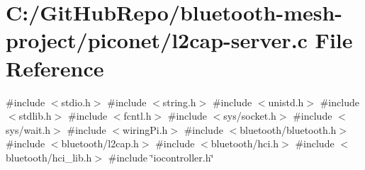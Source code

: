 \hypertarget{piconet_2l2cap-server_8c}{}\section{C\+:/\+Git\+Hub\+Repo/bluetooth-\/mesh-\/project/piconet/l2cap-\/server.c File Reference}
\label{piconet_2l2cap-server_8c}
{\ttfamily \#include $<$stdio.\+h$>$}\newline
{\ttfamily \#include $<$string.\+h$>$}\newline
{\ttfamily \#include $<$unistd.\+h$>$}\newline
{\ttfamily \#include $<$stdlib.\+h$>$}\newline
{\ttfamily \#include $<$fcntl.\+h$>$}\newline
{\ttfamily \#include $<$sys/socket.\+h$>$}\newline
{\ttfamily \#include $<$sys/wait.\+h$>$}\newline
{\ttfamily \#include $<$wiring\+Pi.\+h$>$}\newline
{\ttfamily \#include $<$bluetooth/bluetooth.\+h$>$}\newline
{\ttfamily \#include $<$bluetooth/l2cap.\+h$>$}\newline
{\ttfamily \#include $<$bluetooth/hci.\+h$>$}\newline
{\ttfamily \#include $<$bluetooth/hci\+\_\+lib.\+h$>$}\newline
{\ttfamily \#include \char`\"{}iocontroller.\+h\char`\"{}}\newline

